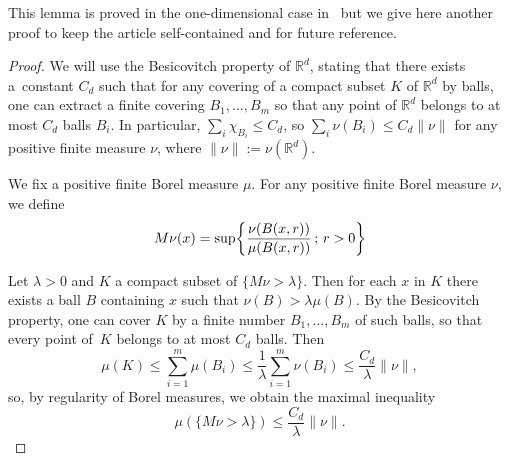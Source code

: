 \documentclass[AHL,Unicode,longabstracts,published]{cedram}
\newcommand{\R}{\mathbb{R}}
\newcounter{setofcase}
\newcounter{case}[setofcase]
\let\originalleft\left
\let\originalright\right
\renewcommand{\left}{\mathopen{}\mathclose\bgroup\originalleft}
\renewcommand{\right}{\aftergroup\egroup\originalright}
\newcommand{\R}{\mathbb{R}}
\begin{document}
This lemma is proved in the one-dimensional case in~\cite[Proposition~2.1]{BOS} but we give here another proof to keep the article self-contained and for future reference.


\begin{proof}
We will use the Besicovitch property of $\R^d$, stating that there exists a~constant $C_d$ such that for any covering of a compact subset $K$ of $\R^d$ by balls, one can extract a finite covering $B_1,\dots,B_m$ so that any point of $\R^d$ belongs to at most $C_d$ balls $B_i$. In particular, $\sum_i \chi_{B_i}\leq C_d$, so $\sum_i \nu(B_i)\leq C_d\|\nu\|$ for any positive finite measure $\nu$, where $\|\nu\|:=\nu(\R^d)$.

We fix a positive finite Borel measure $\mu$. For any positive finite Borel measure $\nu$, we define
\[
M\nu(x)=\sup \left\{\frac{\nu(B(x,r))}{\mu(B(x,r))}\,;\, r>0\right\}
\]

Let $\lambda>0$ and $K$ a compact subset of $\{M\nu>\lambda\}$. Then for each $x$ in $K$ there exists a ball $B$ containing $x$ such that $\nu(B)> \lambda \mu(B)$. By the Besicovitch property, one can cover $K$ by a finite number $B_1,\dots, B_m$ of such balls, so that every point of~$K$ belongs to at most $C_d$ balls. Then
\[
\mu(K)\leq \sum_{i=1}^m \mu(B_i)\leq \frac{1}{\lambda} \sum_{i=1}^m \nu(B_i)\leq \frac{C_d}{\lambda}\|\nu\|,
\]
so, by regularity of Borel measures, we obtain the maximal inequality
\begin{equation}\label{max}
\mu(\{M\nu>\lambda\})\leq \frac{C_d}{\lambda}\|\nu\|.
\end{equation}


\end{proof}
\end{document}
